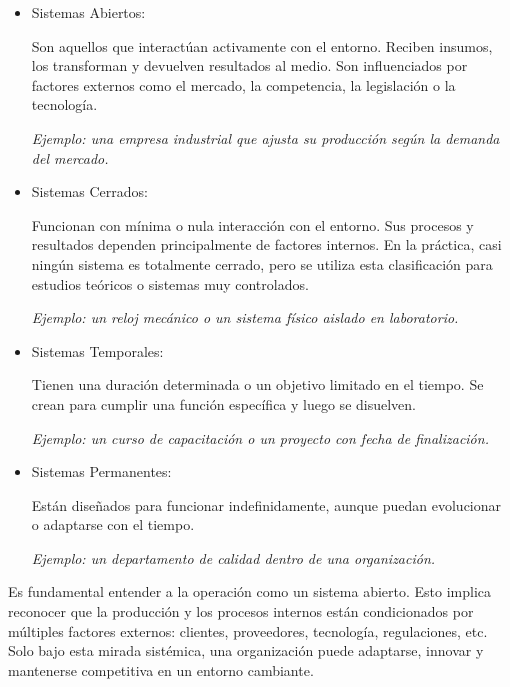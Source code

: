 \documentclass[a4paper,oneside,11pt]{article}
\begin{document}
    \begin{itemize}
        \item Sistemas Abiertos:
        
        Son aquellos que interactúan activamente con el entorno. Reciben insumos, los transforman y devuelven resultados al medio. Son influenciados por factores externos como el mercado, la competencia, la legislación o la tecnología.
    
        \textit{Ejemplo: una empresa industrial que ajusta su producción según la demanda del mercado.}
    
        \item Sistemas Cerrados:
        
        Funcionan con mínima o nula interacción con el entorno. Sus procesos y resultados dependen principalmente de factores internos. En la práctica, casi ningún sistema es totalmente cerrado, pero se utiliza esta clasificación para estudios teóricos o sistemas muy controlados.
    
        \textit{Ejemplo: un reloj mecánico o un sistema físico aislado en laboratorio.}
        
        \item Sistemas Temporales:
        
        Tienen una duración determinada o un objetivo limitado en el tiempo. Se crean para cumplir una función específica y luego se disuelven.
        
        \textit{Ejemplo: un curso de capacitación o un proyecto con fecha de finalización.}
    
        \item Sistemas Permanentes:
        
        Están diseñados para funcionar indefinidamente, aunque puedan evolucionar o adaptarse con el tiempo.
    
        \textit{Ejemplo: un departamento de calidad dentro de una organización.}
    
    \end{itemize}
    
    Es fundamental entender a la operación como un sistema abierto. Esto implica reconocer que la producción y los procesos internos están condicionados por múltiples factores externos: clientes, proveedores, tecnología, regulaciones, etc.
    Solo bajo esta mirada sistémica, una organización puede adaptarse, innovar y mantenerse competitiva en un entorno cambiante.
    
\end{document}
